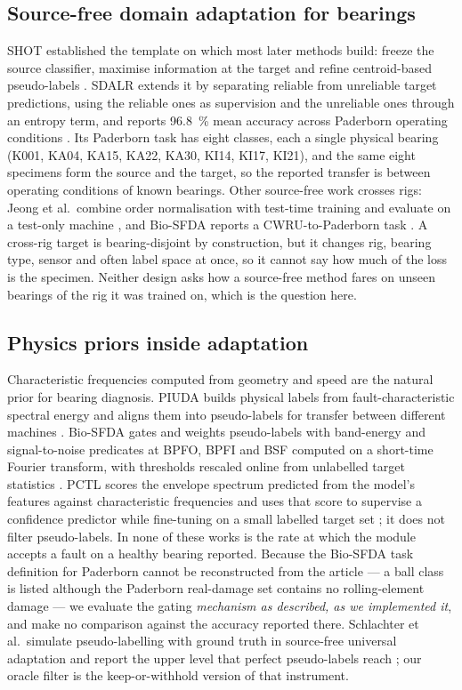 \subsection{Source-free domain adaptation for bearings}

SHOT established the template on which most later methods build: freeze the source classifier, maximise information at the
target and refine centroid-based pseudo-labels \cite{liang2020shot}. SDALR extends it by separating reliable from unreliable
target predictions, using the reliable ones as supervision and the unreliable ones through an entropy term, and reports
\SI{96.8}{\percent} mean accuracy across Paderborn operating conditions \cite{sdalr2025}. Its Paderborn task has eight
classes, each a single physical bearing (K001, KA04, KA15, KA22, KA30, KI14, KI17, KI21), and the same eight specimens form
the source and the target, so the reported transfer is between operating conditions of known bearings. Other source-free
work crosses rigs: Jeong et al.\ combine order normalisation with test-time training and evaluate on a test-only machine
\cite{jeong2025}, and Bio-SFDA reports a CWRU-to-Paderborn task \cite{yoon2026biosfda}. A cross-rig target is
bearing-disjoint by construction, but it changes rig, bearing type, sensor and often label space at once, so it cannot say
how much of the loss is the specimen. Neither design asks how a source-free method fares on unseen bearings of the rig it
was trained on, which is the question here.

\subsection{Physics priors inside adaptation}

Characteristic frequencies computed from geometry and speed are the natural prior for bearing diagnosis. PIUDA builds
physical labels from fault-characteristic spectral energy and aligns them into pseudo-labels for transfer between different machines
\cite{jia2024piuda}. Bio-SFDA gates and weights pseudo-labels with band-energy and signal-to-noise predicates at BPFO, BPFI
and BSF computed on a short-time Fourier transform, with thresholds rescaled online from unlabelled target statistics
\cite{yoon2026biosfda}. PCTL scores the envelope spectrum predicted from the model's features against characteristic
frequencies and uses that score to supervise a confidence predictor while fine-tuning on a small labelled target set
\cite{pctl2026}; it does not filter pseudo-labels. In none of these works is the rate at which the module accepts a fault on
a healthy bearing reported. Because the Bio-SFDA task definition for Paderborn cannot be reconstructed from the article --- a
ball class is listed although the Paderborn real-damage set contains no rolling-element damage --- we evaluate the gating
\emph{mechanism as described, as we implemented it}, and make no comparison against the accuracy reported there.
Schlachter et al.\ simulate pseudo-labelling with ground truth in source-free universal adaptation and report the upper
level that perfect pseudo-labels reach \cite{schlachter2025}; our oracle filter is the keep-or-withhold version of that
instrument.

